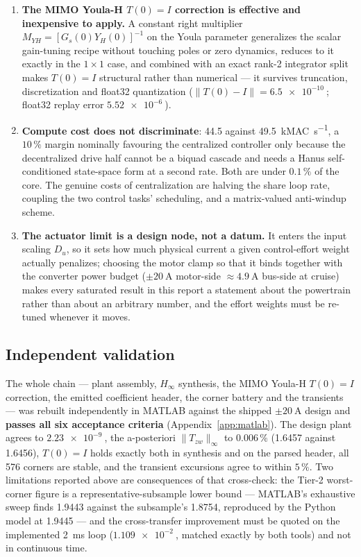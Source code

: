 \documentclass[energies,article,submit,pdftex,oneauthor]{Definitions/mdpi}
\begin{document}
\begin{enumerate}
      tracking, post-saturation recovery speed, and sign-independence.
\item \textbf{The MIMO Youla-H $T(0)=I$ correction is effective and inexpensive to apply.} A constant right
      multiplier $M_{YH} = [G_s(0)Y_H(0)]^{-1}$ on the Youla parameter generalizes the scalar
      gain-tuning recipe without touching poles or zero dynamics, reduces to it exactly in the
      $1\times1$ case, and combined with an exact rank-2 integrator split makes $T(0)=I$
      structural rather than numerical --- it survives truncation, discretization and float32
      quantization ($\|T(0)-I\| = \SI{6.5e-10}{}$; float32 replay error $\SI{5.52e-6}{}$).
\item \textbf{Compute cost does not discriminate}: 44.5 against \SI{49.5}{kMAC\per\second}, a
      $10\,\%$ margin nominally favouring the centralized controller only because the
      decentralized drive half cannot be a biquad cascade and needs a Hanus self-conditioned
      state-space form at a second rate. Both are under $0.1\,\%$ of the core. The genuine costs
      of centralization are halving the share loop rate, coupling the two control tasks'
      scheduling, and a matrix-valued anti-windup scheme.
\item \textbf{The actuator limit is a design node, not a datum.} It enters the input scaling
      $D_u$, so it sets how much physical current a given control-effort weight actually
      penalizes; choosing the motor clamp so that it binds together with the converter power
      budget ($\pm\SI{20}{\ampere}$ motor-side $\approx\SI{4.9}{\ampere}$ bus-side at cruise)
      makes every saturated result in this report a statement about the powertrain rather than
      about an arbitrary number, and the effort weights must be re-tuned whenever it moves.
\end{enumerate}

\subsection{Independent validation}
The whole chain --- plant assembly, $H_\infty$ synthesis, the MIMO Youla-H $T(0)=I$ correction,
the emitted coefficient header, the corner battery and the transients --- was rebuilt
independently in MATLAB against the shipped $\pm\SI{20}{\ampere}$ design and
\textbf{passes all six acceptance criteria} (Appendix~\ref{app:matlab}). The design plant
agrees to $\SI{2.23e-9}{}$, the a-posteriori $\|T_{zw}\|_\infty$ to $0.006\,\%$
(\num{1.6457} against \num{1.6456}), $T(0)=I$ holds exactly both in synthesis and on the
parsed header, all 576 corners are stable, and the transient excursions agree to within
$5\,\%$. Two limitations reported above are consequences of that cross-check: the Tier-2
worst-corner figure is a representative-subsample
lower bound --- MATLAB's exhaustive sweep finds \num{1.9443} against the subsample's
\num{1.8754}, reproduced by the Python model at \num{1.9445} --- and the cross-transfer
improvement must be quoted on the implemented \SI{2}{\milli\second} loop
($\SI{1.109e-2}{}$, matched exactly by both tools) and not in continuous time.
\end{document}
